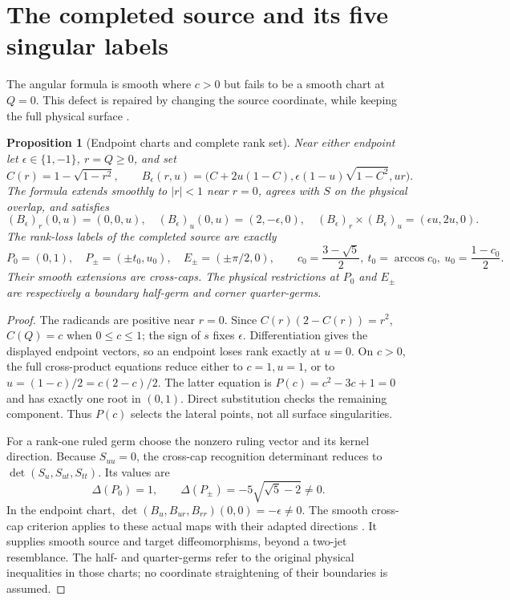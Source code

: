 \documentclass[11pt]{article}
\theoremstyle{readable}
\newtheorem{proposition}[theorem]{Proposition}
\theoremstyle{remark}\newtheorem{remark}[theorem]{Remark}
\begin{document}
\section{The completed source and its five singular labels}\label{sec:atlas}
The angular formula is smooth where $c>0$ but fails to be a smooth chart at
$Q=0$. This defect is repaired by changing the source coordinate, while keeping
the full physical surface \cite{ruled}.
\begin{proposition}[Endpoint charts and complete rank set]\label{prop:atlas}
Near either endpoint let $\epsilon\in\{1,-1\}$, $r=Q\geq0$, and set
\[
 C(r)=1-\sqrt{1-r^2},\qquad
 B_\epsilon(r,u)=\bigl(C+2u(1-C),\epsilon(1-u)\sqrt{1-C^2},ur\bigr).
\]
The formula extends smoothly to $|r|<1$ near $r=0$, agrees with $S$ on the
physical overlap, and satisfies
\[
 (B_\epsilon)_r(0,u)=(0,0,u),\quad
 (B_\epsilon)_u(0,u)=(2,-\epsilon,0),\quad
 (B_\epsilon)_r\times(B_\epsilon)_u=(\epsilon u,2u,0).
\]
The rank-loss labels of the completed source are exactly
\[
 P_0=(0,1),\quad P_\pm=(\pm t_0,u_0),\quad
 E_\pm=(\pm\pi/2,0),\qquad
 c_0=\frac{3-\sqrt5}{2},\ t_0=\arccos c_0,\ u_0=\frac{1-c_0}{2}.
\]
Their smooth extensions are cross-caps. The physical restrictions at $P_0$
and $E_\pm$ are respectively a boundary half-germ and corner quarter-germs.
\end{proposition}
\begin{proof}
The radicands are positive near $r=0$. Since
$C(r)(2-C(r))=r^2$, $C(Q)=c$ when $0\leq c\leq1$; the sign of $s$ fixes
$\epsilon$. Differentiation gives the displayed endpoint vectors, so an
endpoint loses rank exactly at $u=0$. On $c>0$, the full cross-product
equations reduce either to $c=1,u=1$, or to
$u=(1-c)/2=c(2-c)/2$. The latter equation is $P(c)=c^2-3c+1=0$ and has
exactly one root in $(0,1)$. Direct substitution checks the remaining component.
Thus $P(c)$ selects the lateral points, not all surface singularities.

For a rank-one ruled germ choose the nonzero ruling vector and its kernel
direction. Because $S_{uu}=0$, the cross-cap recognition determinant reduces
to $\det(S_u,S_{ut},S_{tt})$. Its values are
\[
 \Delta(P_0)=1,\qquad \Delta(P_\pm)=-5\sqrt{\sqrt5-2}\ne0.
\]
In the endpoint chart,
$\det(B_u,B_{ur},B_{rr})(0,0)=-\epsilon\ne0$.
The smooth cross-cap criterion applies to these actual maps with their adapted
directions \cite[Corollary 4.5 and its proof]{whitneymetric}. It supplies
smooth source and target diffeomorphisms, beyond a two-jet resemblance.
The half- and quarter-germs refer to the original physical inequalities in
those charts; no coordinate straightening of their boundaries is assumed.
\end{proof}
\end{document}
